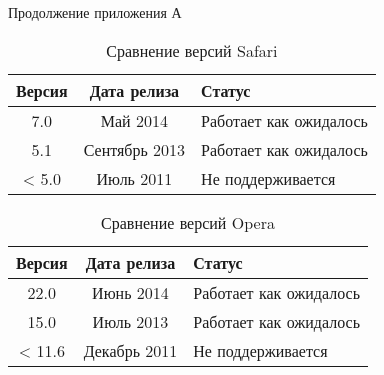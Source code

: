 \newpage
\begin{flushright}
  Продолжение приложения А
\end{flushright}

\begin{table}[h!]
  \captionsetup{width=0.6\textwidth}
  \caption{\label{tab:brows:safari}Сравнение версий Safari}
  \begin{center}
    \begin{tabular}{|c|c|l|}
      \hline
      Версия & Дата релиза & Статус \\
      \hline
      7.0 & Май 2014 & Работает как ожидалось \\
      5.1 & Сентябрь 2013 & Работает как ожидалось \\
      < 5.0 & Июль 2011 & Не поддерживается \\
      \hline
    \end{tabular}
  \end{center}
\end{table}

\begin{table}[h!]
  \captionsetup{width=0.6\textwidth}
  \caption{\label{tab:brows:opera}Сравнение версий Opera}
  \begin{center}
    \begin{tabular}{|c|c|l|}
      \hline
      Версия & Дата релиза & Статус \\
      \hline
      22.0 & Июнь 2014 & Работает как ожидалось \\
      15.0 & Июль 2013 & Работает как ожидалось \\
      < 11.6 & Декабрь 2011 & Не поддерживается \\
      \hline
    \end{tabular}
  \end{center}
\end{table}
